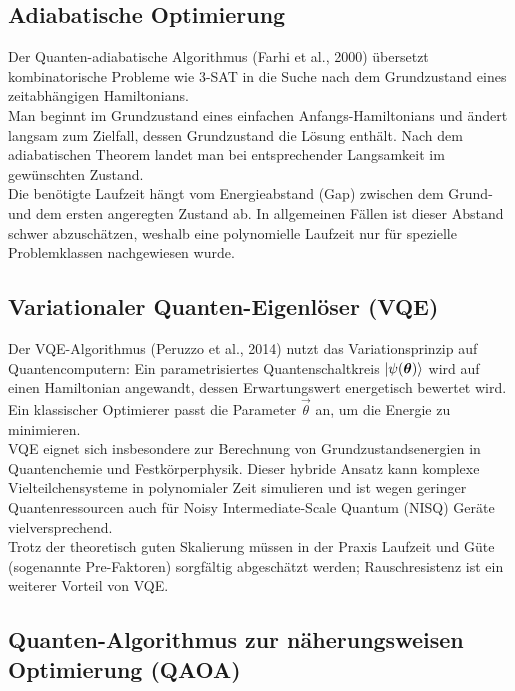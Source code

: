 \subsection{Adiabatische Optimierung}

Der Quanten-adiabatische Algorithmus (Farhi et al., 2000) übersetzt kombinatorische Probleme wie 3-SAT in die Suche nach dem Grundzustand eines zeitabhängigen Hamiltonians.\\
Man beginnt im Grundzustand eines einfachen Anfangs-Hamiltonians und ändert langsam zum Zielfall, dessen Grundzustand die Lösung enthält. Nach dem adiabatischen Theorem landet man bei entsprechender Langsamkeit im gewünschten Zustand.\\
Die benötigte Laufzeit hängt vom Energieabstand (Gap) zwischen dem Grund- und dem ersten angeregten Zustand ab. In allgemeinen Fällen ist dieser Abstand schwer abzuschätzen, weshalb eine polynomielle Laufzeit nur für spezielle Problemklassen nachgewiesen wurde.\\

\subsection{Variationaler Quanten-Eigenlöser (VQE)}

Der VQE-Algorithmus (Peruzzo et al., 2014) nutzt das Variationsprinzip auf Quantencomputern: Ein parametrisiertes Quantenschaltkreis $\ket{\psi(\vec\theta)}$ wird auf einen Hamiltonian angewandt, dessen Erwartungswert energetisch bewertet wird. Ein klassischer Optimierer passt die Parameter $\vec\theta$ an, um die Energie zu minimieren.\\
VQE eignet sich insbesondere zur Berechnung von Grundzustandsenergien in Quantenchemie und Festkörperphysik. Dieser hybride Ansatz kann komplexe Vielteilchensysteme in polynomialer Zeit simulieren und ist wegen geringer Quantenressourcen auch für Noisy Intermediate-Scale Quantum (NISQ) Geräte vielversprechend.\\
Trotz der theoretisch guten Skalierung müssen in der Praxis Laufzeit und Güte (sogenannte Pre-Faktoren) sorgfältig abgeschätzt werden; Rauschresistenz ist ein weiterer Vorteil von VQE.

\subsection{Quanten-Algorithmus zur näherungsweisen Optimierung (QAOA)}


